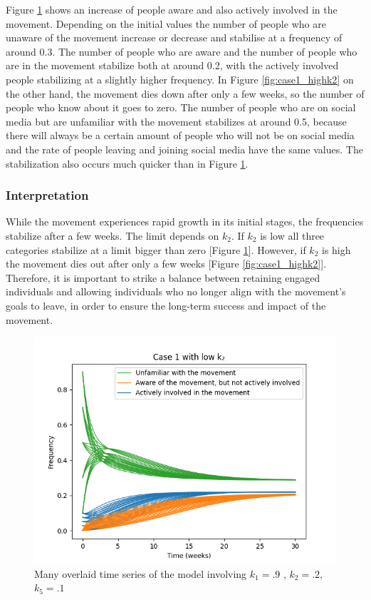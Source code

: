 \documentclass{article}
\begin{document}
    Figure \ref{fig:case1_lowk2} shows an increase of people aware and also actively involved in the movement. Depending on the initial values the number of people who are unaware of the movement increase or decrease and stabilise at a frequency of around 0.3. The number of people who are aware and the number of people who are in the movement stabilize both at around 0.2, with the actively involved people stabilizing at a slightly higher frequency.
    In Figure \ref{fig:case1_highk2} on the other hand, the movement dies down after only a few weeks, so the number of people who know about it goes to zero. The number of people who are on social media but are unfamiliar with the movement stabilizes at around 0.5, because there will always be a certain amount of people who will not be on social media and the rate of people leaving and joining social media have the same values. The stabilization also occurs much quicker than in Figure \ref{fig:case1_lowk2}. 
    
    \subsubsection*{Interpretation}  While the movement experiences rapid growth in its initial stages, the frequencies stabilize after a few weeks. The limit depends on $k_2$. If $k_2$ is low all three categories stabilize at a limit bigger than zero [Figure \ref{fig:case1_lowk2}]. However, if $k_2$ is high the movement dies out after only  a few weeks [Figure \ref{fig:case1_highk2}]. Therefore, it is important to strike a balance between retaining engaged individuals and allowing individuals who no longer align with the movement's goals to leave, in order to ensure the long-term success and impact of the movement.
    
    \begin{figure}[H]

        \centering
        \includegraphics[width=\textwidth]{simulation/plots/case1-lowk2.png}   
        \caption{Many overlaid time series of the model involving \mbox{$k_1=.9$} , \mbox{$k_2=.2$}, \mbox{$k_5=.1$}}
        \label{fig:case1_lowk2}
    \end{figure}
\end{document}
